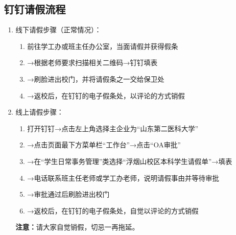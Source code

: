 \subsection[钉钉请假流程]{钉钉请假\footnotemark 流程}
\label{leave_dingtalk}
\begin{enumerate}
    \item 线下请假步骤（正常情况）：
          \begin{enumerate}
              \item 前往学工办或班主任办公室，当面请假并获得假条
              \item →根据老师要求扫描相关二维码→钉钉填表
              \item →刷脸进出校门，并将请假条之一交给保卫处
              \item →返校后，在钉钉的电子假条处，以评论的方式销假
          \end{enumerate}
    \item 线上请假步骤：
          \begin{enumerate}
              \item 打开钉钉→点击左上角选择主企业为“山东第二医科大学”
              \item →点击页面最下方菜单栏“工作台”→点击“OA审批”
              \item →在“学生日常事务管理”类选择“浮烟山校区本科学生请假单”→填表
              \item →电话联系班主任老师或学工办老师，说明请假事由并等待审批
              \item →审批通过后刷脸进出校门
              \item →返校后，在钉钉的电子假条处，自觉以评论的方式销假
          \end{enumerate}
          \textbf{注意：}请大家自觉销假，切忌一再拖延。
\end{enumerate}

